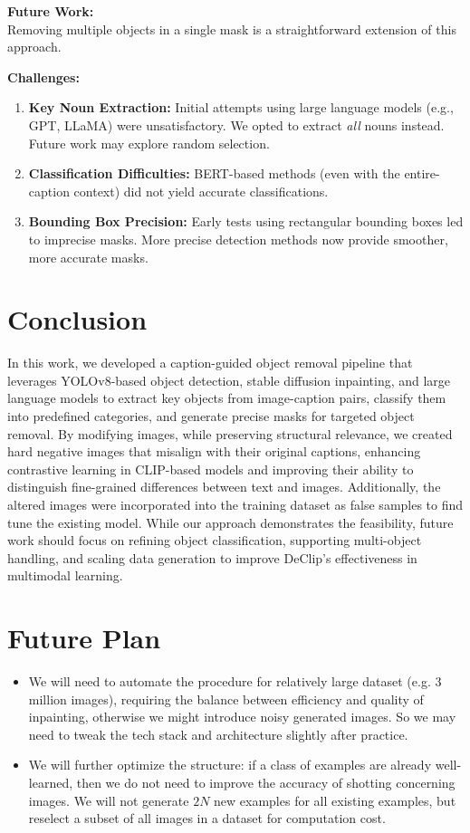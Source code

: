 \documentclass[11pt,letterpaper]{article}
\begin{document}
\noindent
\textbf{Future Work:} \\
Removing multiple objects in a single mask is a straightforward extension of this approach.

\noindent
\textbf{Challenges:}
\begin{enumerate}
    \item \textbf{Key Noun Extraction:} Initial attempts using large language models (e.g., GPT, LLaMA) were unsatisfactory. We opted to extract \emph{all} nouns instead. Future work may explore random selection.
    \item \textbf{Classification Difficulties:} BERT-based methods (even with the entire-caption context) did not yield accurate classifications.
    \item \textbf{Bounding Box Precision:} Early tests using rectangular bounding boxes led to imprecise masks. More precise detection methods now provide smoother, more accurate masks.
\end{enumerate}



\section{Conclusion}
In this work, we developed a caption-guided object removal pipeline that leverages YOLOv8-based object detection, stable diffusion inpainting, and large language models to extract key objects from image-caption pairs, classify them into predefined categories, and generate precise masks for targeted object removal. By modifying images, while preserving structural relevance, we created hard negative images that misalign with their original captions, enhancing contrastive learning in CLIP-based models and improving their ability to distinguish fine-grained differences between text and images. Additionally, the altered images were incorporated into the training dataset as false samples to find tune the existing model. While our approach demonstrates the feasibility, future work should focus on refining object classification, supporting multi-object handling, and scaling data generation to improve DeClip’s effectiveness in multimodal learning.

\section{Future Plan}
\begin{itemize}
    \item We will need to automate the procedure for relatively large dataset (e.g. 3 million images), requiring the balance between efficiency and quality of inpainting, otherwise we might introduce noisy generated images. So we may need to tweak the tech stack and architecture slightly after practice.
    \item We will further optimize the structure: if a class of examples are already well-learned, then we do not need to improve the accuracy of shotting concerning images. We will not generate $2N$ new examples for all existing examples, but reselect a subset of all images in a dataset for computation cost.
\end{itemize}
\end{document}
